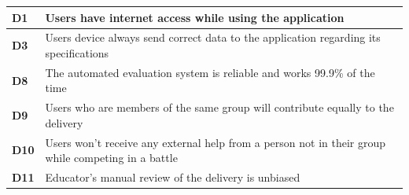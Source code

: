 \documentclass[../RASD.tex]{subfiles}
\begin{document}
\begin{table}[ht]
\begin{center}
\begin{tabular}{|m{2em}|m{30em}|}
                \textbf{D1} & Users have internet access while using the application\\
                \hline
                \cellcolor{ReqMappingCell3}
                \textbf{D3} & Users device always send correct data to the application regarding its specifications\\
                \hline
                \cellcolor{ReqMappingCell3}
                \textbf{D8} & The automated evaluation system is reliable and works 99.9\% of the time\\
                \hline
                \cellcolor{ReqMappingCell3}
                \textbf{D9} & Users who are members of the same group will contribute equally to the delivery\\
                \hline
                \cellcolor{ReqMappingCell3}
                \textbf{D10} & Users won't receive any external help from a person not in their group while competing in a battle\\
                \hline
                \cellcolor{ReqMappingCell3}
                \textbf{D11} & Educator's manual review of the delivery is unbiased\\
                \hline
                \end{tabular}
            \end{center}
        \end{table}\newpage
\end{document}
